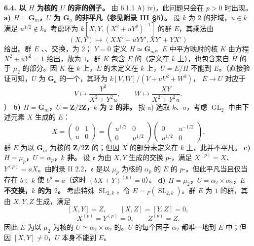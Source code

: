 \textbf{6.4. 以 $H$ 为核的 $U$ 的非的例子。}
由 6.1.1 A) iv)，此问题只会在 $p>0$ 时出现。
\textbf{a) $H=\mathbf G_m$，$U$ 为 $\mathbf G_a$ 的非平凡（参见附录 III §5）。}
设 $k$ 为 $2$ 的非域，$u\in k$ 满足 $u^{1/2}\notin k$。考虑环为 $k[X,Y,(X^2+uY^2)^{-1}]$ 的群 $E$，其乘法由
\[(X,Y)\longmapsto(XX'+uYY',XY'+YX')\]
给出。群 $E$ 、、交换，为 $2$； $Y=0$ 定义 $H\simeq\mathbf G_m$。$E$ 中平方映射的核 $K$ 由方程 $X^2+uY^2=1$ 给出，故为 $1$。群 $K$ 包含 $E$ 的（定义在 $\bar k$ 上），也包含来自 $H$ 的于 $\mu_2$ 的部分。因 $K$ 在 $k$ 上，$E$ 的未定义在 $k$ 上，$U=E/H$ 不能到 $E$。（直接验证可知，$U$ 为 $\mathbf G_a$ 的一个，其环为 $k[V,W]/(V+uV^2+W^2)$， $E\to U$ 对应于
\[V\longmapsto\frac{Y^2}{X^2+Y^2u},\qquad W\longmapsto\frac{XY}{X^2+Y^2u}.\]）
\textbf{b) $H=\mathbf G_m$，$U=\mathbf Z/2\mathbf Z$，$k$ 为 $2$ 的非。}
按 a) 选取 $k$、$u$，考虑 $\operatorname{GL}_2$ 中由下述元素 $X$ 生成的 $E$：
\[X=\begin{pmatrix}0&1\\u&0\end{pmatrix}
=\begin{pmatrix}u^{1/2}&0\\0&u^{1/2}\end{pmatrix}
\begin{pmatrix}0&u^{-1/2}\\u^{1/2}&0\end{pmatrix}.\]
群 $E$ 为以 $\mathbf G_m$ 为核的 $\mathbf Z/2\mathbf Z$ 的；但因 $X$ 的部分未定义在 $k$ 上，此并不平凡。
\textbf{c) $H=\mu_p$，$U=\alpha_p$，$k$ 非。}
设 $\mathfrak e$ 为由 $X,Y$ 生成的交换 $p$-，满足 $X^{(p)}=X$、$Y^{(p)}=aX$。由附录 II 2.2，$\mathfrak e$ 是以 $\mu_p$ 为核的 $\alpha_p$ 的 $E$ 的 $p$-。但此平凡当且仅当存在 $b\in k$ 使 $b^p=a$（这时 $(bX+Y)^{(p)}=0$）。
\textbf{d) $H=\mu_2$，$U=\alpha_2\times\alpha_2$，$E$ 不交换，$k$ 的为 $2$。}
考虑特殊 $\operatorname{SL}_{2,k}$，令 $E={}_F(\operatorname{SL}_{2,k})$。群 $E$ 为 $1$ 的群，其 由 $X,Y,Z$ 生成，满足
\[[X,Y]=Z,\qquad[X,Z]=[Y,Z]=0,\]
\[X^{(p)}=Y^{(p)}=0,\qquad Z^{(p)}=Z.\]
因此 $E$ 为以 $\mu_2$ 为核的 $U\simeq\alpha_2\times\alpha_2$ 的。$U$ 的每个因子 $\alpha_2$ 都唯一地到 $E$ 中；但因 $[X,Y]\ne0$，$U$ 本身不能到 $E$。

